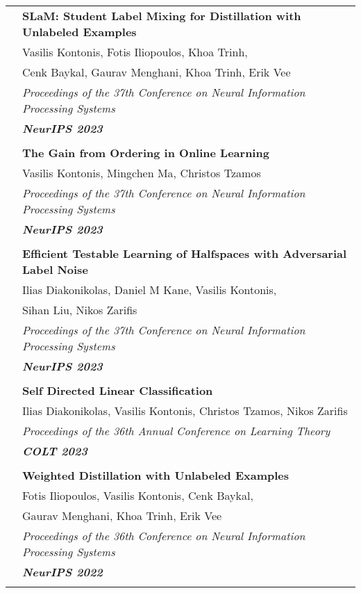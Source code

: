 \documentclass[letterpaper,11pt,oneside]{article}
\begin{document}
\begin{longtable}{@{} l l}
 &\textbf{SLaM: Student Label Mixing for Distillation with Unlabeled Examples}\\
 & Vasilis Kontonis, Fotis Iliopoulos,  Khoa Trinh,\\
 & Cenk Baykal, Gaurav Menghani, Khoa Trinh, Erik Vee\\ 
& \emph{Proceedings of the 37th Conference on Neural Information Processing Systems} \\
& \emph{\textbf{NeurIPS 2023}} \\
 & \\

 &\textbf{The Gain from Ordering in Online Learning}\\
 & Vasilis Kontonis, Mingchen Ma, Christos Tzamos\\
& \emph{Proceedings of the 37th Conference on Neural Information Processing Systems} \\
& \emph{\textbf{NeurIPS 2023}} \\
 & \\

 &\textbf{Efficient Testable Learning of Halfspaces with Adversarial Label Noise}\\
 & Ilias Diakonikolas, Daniel M Kane, Vasilis Kontonis, \\
 & Sihan Liu, Nikos Zarifis\\
& \emph{Proceedings of the 37th Conference on Neural Information Processing Systems} \\
& \emph{\textbf{NeurIPS 2023}} \\
 & \\


 &\textbf{Self Directed Linear Classification}\\
 & Ilias Diakonikolas, Vasilis Kontonis, Christos Tzamos, Nikos Zarifis \\
 & \emph{Proceedings of the 36th Annual Conference on Learning Theory}\\
 & \emph{\textbf{COLT 2023}} \\
 & \\

 &\textbf{Weighted Distillation with Unlabeled Examples}\\
 & Fotis Iliopoulos, Vasilis Kontonis, Cenk Baykal,\\
 & Gaurav Menghani, Khoa Trinh, Erik Vee\\ 
& \emph{Proceedings of the 36th Conference on Neural Information Processing Systems} \\
& \emph{\textbf{NeurIPS 2022}} \\
 & \\


\end{longtable}
\end{document}
